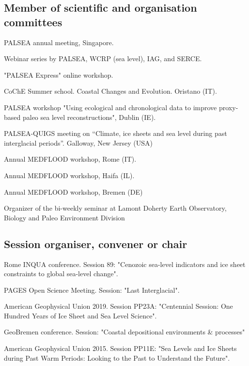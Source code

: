 \documentclass[11pt]{article}
\begin{document}
\bigskip
{\normalfont 
\subsection{Member of scientific and organisation committees}
{\footnotesize
\begin{description}
  \item [2022] PALSEA annual meeting, Singapore.
  \item [2021] Webinar series by PALSEA, WCRP (sea level), IAG, and SERCE.
  \item [2020] "PALSEA Express" online workshop.
  \item [2019] CoChE Summer school. Coastal Changes and Evolution. Oristano (IT).
  \item [2019] PALSEA workshop "Using ecological and chronological data to improve proxy-based paleo sea level reconstructions", Dublin (IE).
  \item [2017] PALSEA-QUIGS meeting on “Climate, ice sheets and sea level during past interglacial periods”. Galloway, New Jersey (USA)
  \item [2012] Annual MEDFLOOD workshop, Rome (IT).
  \item [2014] Annual MEDFLOOD workshop, Haifa (IL).
  \item [2016] Annual MEDFLOOD workshop, Bremen (DE)
  \item [2013] Organizer of the bi-weekly seminar at Lamont Doherty Earth Observatory, Biology and Paleo Environment Division
  \item \end{description}}}

{\normalfont 
\subsection{Session organiser, convener or chair}
{\footnotesize
\begin{description}
  \item [2023] Rome INQUA conference. Session 89: "Cenozoic sea-level indicators and ice sheet constraints to global sea-level change".
  \item [2022] PAGES Open Science Meeting. Session: "Last Interglacial".
  \item [2019] American Geophysical Union 2019. Session PP23A: "Centennial Session: One Hundred Years of Ice Sheet and Sea Level Science".
  \item [2017] GeoBremen conference. Session: "Coastal depositional environments \& processes"
  \item [2015] American Geophysical Union 2015. Session PP11E: "Sea Levels and Ice Sheets during Past Warm Periods: Looking to the Past to Understand the Future".
  \item \end{description}}}
\end{document}
